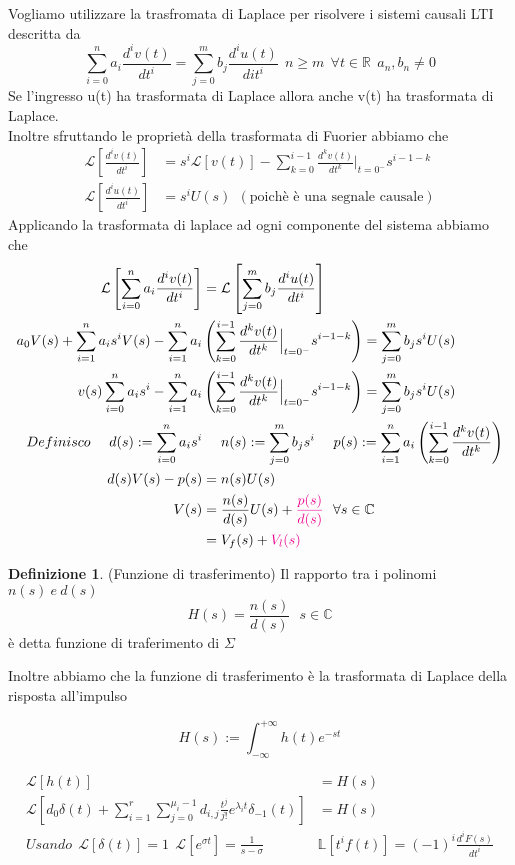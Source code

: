 \documentclass{article}
\theoremstyle{definition}
\newtheorem*{definizione}{Definizione}
\newcommand{\R}{\mathbb{R}}
\newcommand{\la}{\lambda}
\newcommand{\intinf}{\int_{-\infty}^{+\infty}}
\newcommand{\sistema}{\sum_{i=0}^{n}a_i \frac{d^i v(t)}{dt^i}=\sum_{j=0}^{m}b_j \frac{d^i u(t)}{dit^i}}
\begin{document}
	Vogliamo utilizzare la trasfromata di Laplace per risolvere i sistemi causali LTI descritta da 
	$$\sistema \ \ n \geq m \ \ \forall t \in \R \ \ a_n , b_n \neq 0$$
	Se l'ingresso u(t) ha trasformata di Laplace allora anche v(t) ha trasformata di Laplace.\\ Inoltre sfruttando le proprietà della trasformata di Fuorier abbiamo che 
	\begin{align*}
	\mathcal{L}\left[\frac{d^iv(t)}{dt^i}\right]&=s^i \mathcal{L}[v(t)] - \sum_{k=0}^{i-1}\frac{d^kv(t)}{dt^k} \Big|_{t=0^-} s^{i-1-k} \\ 
	\mathcal{L}\left[\frac{d^iu(t)}{dt^i}\right]&=s^i U(s) \ \ (\text{poichè è una segnale causale})
		\end{align*}
		Applicando la trasformata di laplace ad ogni componente del sistema abbiamo che 
		\begin{align*}
			\mathcal{L}\left[\sum_{i=0}^{n}a_i \frac{d^i v(t)}{dt^i} \right]&=\mathcal{L}\left[\sum_{j=0}^{m}b_j \frac{d^iu(t)}{dt^i} \right] \\
			a_0 V(s) + \sum_{i=1}^{n}a_i s^i V(s) - \sum_{i=1}^{n}a_i&\left(\sum_{k=0}^{i-1}\frac{d^kv(t)}{dt^k} \Big|_{t=0^-} s^{i-1-k}\right)= \sum_{j=0}^{m}b_j s^i U(s) \\
			v(s)\sum_{i=0}^{n}a_i s^i  - \sum_{i=1}^{n}a_i&\left(\sum_{k=0}^{i-1}\frac{d^kv(t)}{dt^k} \Big|_{t=0^-} s^{i-1-k}\right)= \sum_{j=0}^{m}b_j s^i U(s) \\ 
			 Definisco \ \ \ \ d(s) := \sum_{i=0}^{n}a_i s^i  & \ \ \ \ n(s):= \sum_{j=0}^{m}b_j s^i \ \ \ \ p(s):= \sum_{i=1}^{n}a_i\left(\sum_{k=0}^{i-1}\frac{d^kv(t)}{dt^k}\right) \\
		  d(s) V(s)-p(s)&=n(s)U(s) \\
		 V(s)&=\frac{n(s)}{d(s)}U(s) + \textcolor{magenta}{\frac{p(s)}{d(s)} }\ \ \forall s \in \mathbb{C}  \\
		 &= V_f(s)+ \textcolor{magenta}{V_l(s)}
		\end{align*}
		\begin{definizione}(Funzione di trasferimento)
			Il rapporto tra i polinomi $n(s) \ e \ d(s)$ 
			$$H(s) = \frac{n(s)}{d(s)} \ \ \ s \in \mathbb{C} $$ \label{formu:1}
			è detta funzione di traferimento di $\Sigma$
		\end{definizione}
		Inoltre abbiamo che la funzione di trasferimento è la trasformata di Laplace della risposta all'impulso 
		\begin{tcolorbox}
$$H(s):=\intinf h(t)e^{-st}$$ 
		\end{tcolorbox}
		\begin{align*}
		\mathcal{L}[h(t)]&=H(s) \\ 
		\mathcal{L}\left[d_0 \delta(t)+\sum_{i=1}^{r}\sum_{j=0}^{\mu_i-1}d_{i,j}\frac{t^j}{j!}e^{\la_i t}\delta_{-1}(t)\right]&=H(s) \\  
		Usando  \ \ \mathcal{L}[\delta(t)]=1 \ \ \mathcal{L}[e^{\sigma t}]=\frac{1}{s-\sigma }\ \ & \mathbb{L}[t^if(t)]=(-1)^i \frac{d^iF(s)}{dt^i}\\ 
		\end{align*}
\end{document}
